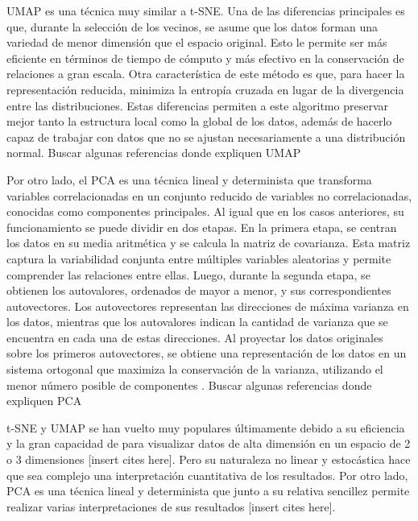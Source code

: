 UMAP es una técnica muy similar a t-SNE. Una de las diferencias principales es que, durante la selección de los vecinos, se asume que los datos forman una variedad de menor dimensión que el espacio original. Esto le permite ser más eficiente en términos de tiempo de cómputo y más efectivo en la conservación de relaciones a gran escala. Otra característica de este método es que, para hacer la representación reducida, minimiza la entropía cruzada en lugar de la divergencia entre las distribuciones. Estas diferencias permiten a este algoritmo preservar mejor tanto la estructura local como la global de los datos, además de hacerlo capaz de trabajar con datos que no se ajustan necesariamente a una distribución normal. \alert{Buscar algunas referencias donde expliquen UMAP} %

Por otro lado, el PCA es una técnica lineal y determinista que transforma variables correlacionadas en un conjunto reducido de variables no correlacionadas, conocidas como componentes principales. Al igual que en los casos anteriores, su funcionamiento se puede dividir en dos etapas. En la primera etapa, se centran los datos en su media aritmética y se calcula la matriz de covarianza. Esta matriz captura la variabilidad conjunta entre múltiples variables aleatorias y permite comprender las relaciones entre ellas. Luego, durante la segunda etapa, se obtienen los autovalores, ordenados de mayor a menor, y sus correspondientes autovectores. Los autovectores representan las direcciones de máxima varianza en los datos, mientras que los autovalores indican la cantidad de varianza que se encuentra en cada una de estas direcciones. Al proyectar los datos originales sobre los primeros autovectores, se obtiene una representación de los datos en un sistema ortogonal que maximiza la conservación de la varianza, utilizando el menor número posible de componentes \cite{Lever2017}. \alert{Buscar algunas referencias donde expliquen PCA} %

t-SNE y UMAP se han vuelto muy populares últimamente debido a su eficiencia y la gran capacidad de para visualizar datos de alta dimensión en un espacio de 2 o 3 dimensiones \alert{[insert cites here]}. Pero su naturaleza no linear y estocástica hace que sea complejo una interpretación cuantitativa de los resultados. Por otro lado, PCA es una técnica lineal y determinista que junto a su relativa sencillez permite realizar varias interpretaciones de sus resultados \alert{[insert cites here]}.

